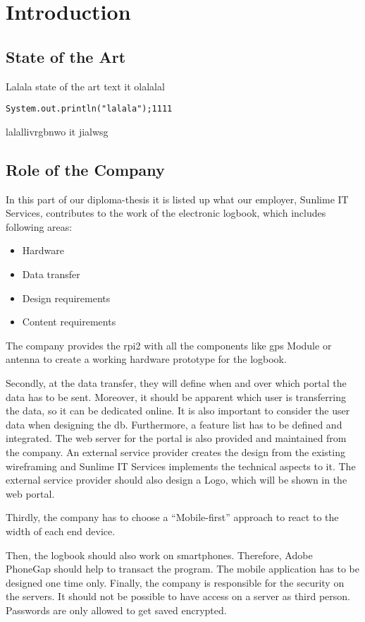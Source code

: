 \newpage
\chapter*{Introduction}
\section*{State of the Art}
Lalala state of the art text \gls{it} olalalal
\begin{verbatim}
System.out.println("lalala");1111
\end{verbatim}
lalallivrgbnwo \gls{it} jialwsg

\newpage
\section*{Role of the Company}
In this part of our diploma-thesis it is listed up what our employer, Sunlime IT Services, contributes to the work of the electronic logbook, which includes following areas:
\begin{itemize}
\item Hardware
\item Data transfer
\item Design requirements
\item Content requirements
\end{itemize}
The company provides the \gls{rpi2} with all the components like \gls{gps} Module or antenna to create a working hardware prototype for the logbook.

Secondly, at the data transfer, they will define when and over which portal the data has to be sent. Moreover, it should be apparent which user is transferring the data, so it can be dedicated online. It is also important to consider the user data when designing the \gls{db}. Furthermore, a feature list has to be defined and integrated.
The web server for the portal is also provided and maintained from the company.
\newline \newline
An external service provider creates the design from the existing wireframing and Sunlime IT Services implements the technical aspects to it. The external service provider should also design a Logo, which will be shown in the web portal.

Thirdly, the company has to choose a “Mobile-first” approach to react to the width of each end device.

Then, the logbook should also work on smartphones. Therefore, Adobe PhoneGap should help to transact the program. The mobile application has to be designed one time only.
\newline \newline
Finally, the company is responsible for the security on the servers. It should not be possible to have access on a server as third person. Passwords are only allowed to get saved encrypted.
\newpage
